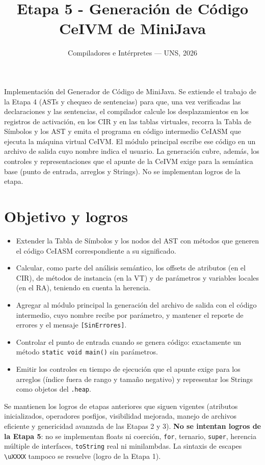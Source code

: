 \documentclass[11pt,a4paper]{article}
\title{Etapa 5 - Generación de Código CeIVM de MiniJava}
\author{Compiladores e Intérpretes --- UNS, 2026}
\date{}
\begin{document}
\sloppy

\maketitle

\noindent
Implementación del Generador de Código de MiniJava. Se extiende el trabajo de la
Etapa 4 (ASTs y chequeo de sentencias) para que, una vez verificadas las
declaraciones y las sentencias, el compilador calcule los desplazamientos en los
registros de activación, en los CIR y en las tablas virtuales, recorra la Tabla de
Símbolos y los AST y emita el programa en código intermedio CeIASM que ejecuta la
máquina virtual CeIVM. El módulo principal escribe ese código en un archivo de
salida cuyo nombre indica el usuario. La generación cubre, además, los controles
y representaciones que el apunte de la CeIVM exige para la semántica base
(punto de entrada, arreglos y Strings). No se implementan logros de la etapa.

\section{Objetivo y logros}

\begin{itemize}
  \item Extender la Tabla de Símbolos y los nodos del AST con métodos que generen
        el código CeIASM correspondiente a su significado.
  \item Calcular, como parte del análisis semántico, los offsets de atributos (en
        el CIR), de métodos de instancia (en la VT) y de parámetros y variables
        locales (en el RA), teniendo en cuenta la herencia.
  \item Agregar al módulo principal la generación del archivo de salida con el
        código intermedio, cuyo nombre recibe por parámetro, y mantener el
        reporte de errores y el mensaje \texttt{[SinErrores]}.
  \item Controlar el punto de entrada cuando se genera código: exactamente un
        método \texttt{static void main()} sin parámetros.
  \item Emitir los controles en tiempo de ejecución que el apunte exige para los
        arreglos (índice fuera de rango y tamaño negativo) y representar los
        Strings como objetos del \texttt{.heap}.
\end{itemize}

Se mantienen los logros de etapas anteriores que siguen vigentes (atributos
inicializados, operadores posfijos, visibilidad mejorada, manejo de archivos
eficiente y genericidad avanzada de las Etapas 2 y 3). \textbf{No se intentan
logros de la Etapa 5}: no se implementan floats ni coerción, \texttt{for},
ternario, \texttt{super}, herencia múltiple de interfaces, \texttt{toString} real
ni minilambdas. La sintaxis de escapes \texttt{\textbackslash uXXXX} tampoco se
resuelve (logro de la Etapa 1).
\end{document}
